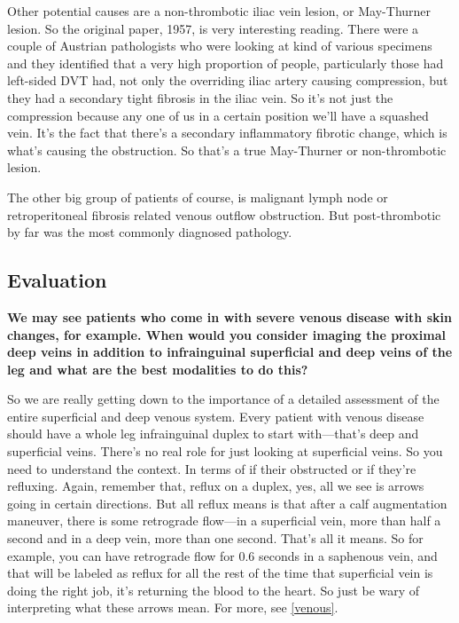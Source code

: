 \documentclass[
]{book}
\begin{document}
Other potential causes are a non-thrombotic iliac vein lesion, or
May-Thurner lesion. So the original paper, 1957, is very interesting
reading.\citep{may1957} There were a couple of Austrian pathologists who were
looking at kind of various specimens and they identified that a very
high proportion of people, particularly those had left-sided DVT had,
not only the overriding iliac artery causing compression, but they had a
secondary tight fibrosis in the iliac vein. So it's not just the
compression because any one of us in a certain position we'll have a
squashed vein. It's the fact that there's a secondary inflammatory
fibrotic change, which is what's causing the obstruction. So that's a
true May-Thurner or non-thrombotic lesion.

The other big group of patients of course, is malignant lymph node or
retroperitoneal fibrosis related venous outflow obstruction. But
post-thrombotic by far was the most commonly diagnosed pathology.

\hypertarget{evaluation-19}{%
\subsection{Evaluation}\label{evaluation-19}}

\textbf{We may see patients who come in with severe venous disease with skin
changes, for example. When would you consider imaging the proximal deep
veins in addition to infrainguinal superficial and deep veins of the leg
and what are the best modalities to do this?}

So we are really getting down to the importance of a detailed assessment
of the entire superficial and deep venous system. Every patient with
venous disease should have a whole leg infrainguinal duplex to start
with---that's deep and superficial veins. There's no real role for just
looking at superficial veins. So you need to understand the context. In
terms of if their obstructed or if they're refluxing. Again, remember
that, reflux on a duplex, yes, all we see is arrows going in certain
directions. But all reflux means is that after a calf augmentation
maneuver, there is some retrograde flow---in a superficial vein, more
than half a second and in a deep vein, more than one second. That's all
it means. So for example, you can have retrograde flow for 0.6 seconds
in a saphenous vein, and that will be labeled as reflux for all the rest
of the time that superficial vein is doing the right job, it's returning
the blood to the heart. So just be wary of interpreting what these
arrows mean. For more, see \ref{venous}.
\end{document}

